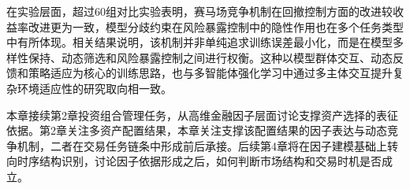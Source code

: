 在实验层面，超过60组对比实验表明，赛马场竞争机制在回撤控制方面的改进较收益率改进更为一致，模型分歧约束在风险暴露控制中的隐性作用也在多个任务类型中有所体现。相关结果说明，该机制并非单纯追求训练误差最小化，而是在模型多样性保持、动态筛选和风险暴露控制之间进行权衡。这种以模型群体交互、动态反馈和策略适应为核心的训练思路，也与多智能体强化学习中通过多主体交互提升复杂环境适应性的研究取向相一致\cite{lowe2017multi}。

本章接续第2章投资组合管理任务，从高维金融因子层面讨论支撑资产选择的表征依据。第2章关注多资产配置结果，本章关注支撑该配置结果的因子表达与动态竞争机制，二者在交易任务链条中形成前后承接。后续第4章将在因子建模基础上转向时序结构识别，讨论因子依据形成之后，如何判断市场结构和交易时机是否成立。
